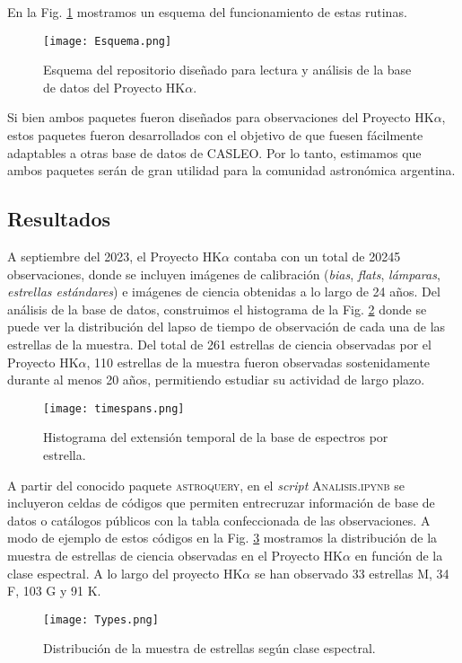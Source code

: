 \documentclass[baaa]{baaa}
\begin{document}
En la Fig. \ref{fig:esq} mostramos un esquema del funcionamiento de estas rutinas. 
\begin{figure}[htb!]
\centering
    \texttt{[image: Esquema.png]}
    \caption{Esquema del repositorio diseñado para lectura y análisis de la base de datos del Proyecto HK$\alpha$.}
    \label{fig:esq}
\end{figure}
Si bien ambos paquetes fueron diseñados para observaciones del Proyecto HK$\alpha$, estos paquetes fueron  desarrollados con el objetivo de que fuesen  fácilmente adaptables a otras base de datos de CASLEO. Por lo tanto, estimamos que ambos paquetes serán de gran utilidad para la comunidad astronómica argentina.
\subsection{Resultados}\label{ssec.res}
 A septiembre del 2023, el Proyecto HK$\alpha$ contaba con un total de 20245 observaciones, donde se incluyen imágenes de calibración (\textit{bias}, \textit{flats}, \textit{lámparas}, \textit{estrellas estándares}) e imágenes de ciencia obtenidas a lo largo de 24 años. Del análisis de la base de datos, construimos el histograma de la Fig. \ref{fig:obstime}  donde se puede ver la distribución del lapso de tiempo de observación de cada una de las estrellas de la muestra. Del total de  261 estrellas de ciencia observadas por el Proyecto HK$\alpha$, 110 estrellas de la muestra fueron observadas sostenidamente durante al menos 20 años, permitiendo estudiar su actividad de largo plazo.
\begin{figure}[htb!]
    \texttt{[image: timespans.png]}
    \caption{Histograma del extensión temporal de la base de espectros por estrella.}
    \label{fig:obstime}
\end{figure}

A partir del conocido paquete \textsc{astroquery}, en el \emph{script} \textsc{Analisis.ipynb} se incluyeron celdas de códigos que permiten entrecruzar información de base de datos o catálogos públicos con la tabla confeccionada de las observaciones. A modo de ejemplo de estos códigos en la Fig. \ref{fig:sp} mostramos la distribución de la muestra de estrellas de ciencia observadas en el Proyecto HK$\alpha$ en función de la clase espectral. A lo largo del proyecto HK$\alpha$ se han observado 33 estrellas M, 34 F, 103 G y 91 K.
\begin{figure}
    \centering
    \texttt{[image: Types.png]}
    \caption{Distribución de la muestra de estrellas según clase espectral.}
    \label{fig:sp}
\end{figure}
\end{document}
